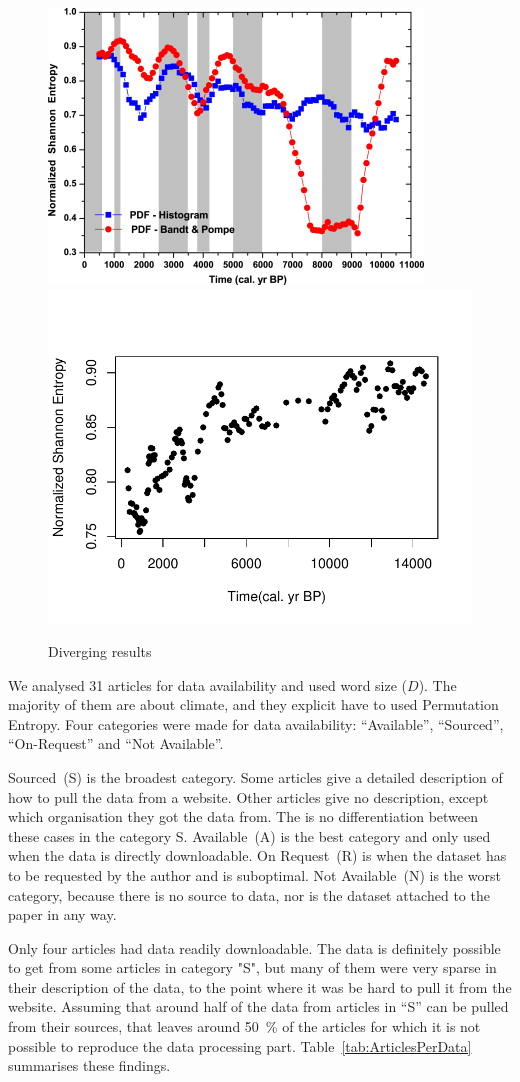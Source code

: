 \begin{figure}[hbt]
	\centering
	{\includegraphics[width=.48\textwidth,keepaspectratio]{ElNino/ArticleEntropyPlot.jpg}}
	{\includegraphics[width=.48\textwidth,keepaspectratio]{ElNino/Entropy.pdf}}
	\caption{Diverging results}\label{fig:Diverging}
\end{figure}

We analysed \num{31} articles for data availability and used word size ($D$). 
The majority of them are about climate, and they explicit have to used Permutation Entropy. Four categories were made for data availability: “Available”, “Sourced”, “On-Request” and “Not Available”. 

Sourced~(S) is the broadest category. 
Some articles give a detailed description of how to pull the data from a website. 
Other articles give no description, except which organisation they got the data from. 
The is no differentiation between these cases in the category S. 
Available~(A) is the best category and only used when the data is directly downloadable. 
On Request~(R) is when the dataset has to be requested by the author and is suboptimal. 
Not Available~(N) is the worst category, because there is no source to data, nor is the dataset attached to the paper in any way. 

Only four articles had data readily downloadable. 
The data is definitely possible to get from some articles in category "S", but many of them were very sparse in their description of the data, to the point where it was be hard to pull it from the website. 
Assuming that around half of the data from articles in ``S'' can be pulled from their sources, that leaves around \SI{50}{\percent} of the articles for which it is not possible to reproduce the data processing part. 
Table~\ref{tab:ArticlesPerData} summarises these findings.

